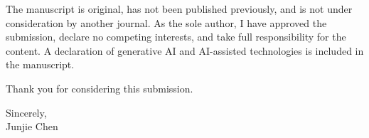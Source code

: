 \documentclass[11pt]{article}
\begin{document}
The manuscript is original, has not been published previously, and is not under
consideration by another journal. As the sole author, I have approved the
submission, declare no competing interests, and take full responsibility for
the content. A declaration of generative AI and AI-assisted technologies is
included in the manuscript.

\vspace{1em}
\noindent Thank you for considering this submission.

\vspace{1.5em}
\noindent Sincerely,\\[0.3em]
Junjie Chen
\end{document}
